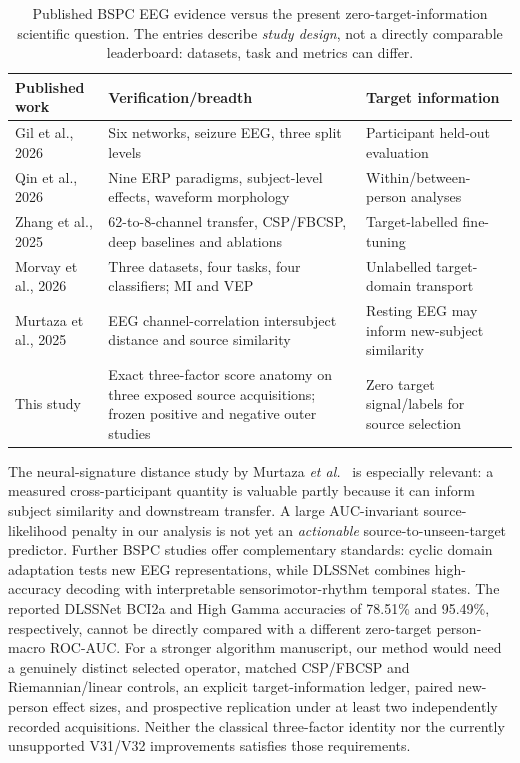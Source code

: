 \begin{table}[tb]
\centering\small
\caption{Published BSPC EEG evidence versus the present
zero-target-information scientific question.
The entries describe \emph{study design}, not
a directly comparable leaderboard:
datasets, task and metrics can differ.}
\label{tab:bspc-paper-budget}
\setlength{\tabcolsep}{3.2pt}
\begin{tabular}{p{.24\linewidth}p{.34\linewidth}p{.30\linewidth}}
\toprule
Published work & Verification/breadth & Target information\\
\midrule
Gil et al., 2026 \cite{gil2026subjectvalidation}
& Six networks, seizure EEG, three split levels
& Participant held-out evaluation\\
Qin et al., 2026 \cite{qin2026spatialnorm}
& Nine ERP paradigms, subject-level effects,
waveform morphology
& Within/between-person analyses\\
Zhang et al., 2025 \cite{zhang2025crossdataset_gcn}
& 62-to-8-channel transfer, CSP/FBCSP,
deep baselines and ablations
& Target-labelled fine-tuning\\
Morvay et al., 2026 \cite{morvay2026wbt}
& Three datasets, four tasks, four
classifiers; MI and VEP
& Unlabelled target-domain transport\\
Murtaza et al., 2025 \cite{murtaza2025signature}
& EEG channel-correlation intersubject
distance and source similarity
& Resting EEG may inform new-subject similarity\\
This study
& Exact three-factor score anatomy on
three exposed source acquisitions;
frozen positive and negative outer studies
& Zero target signal/labels for source selection\\
\bottomrule
\end{tabular}
\end{table}

The neural-signature distance study by
Murtaza \emph{et al.}\ \cite{murtaza2025signature}
is especially relevant: a measured
cross-participant quantity is valuable partly
because it can inform subject similarity
and downstream transfer. A large
AUC-invariant source-likelihood penalty
in our analysis is not yet an \emph{actionable}
source-to-unseen-target predictor.
Further BSPC studies offer complementary
standards: cyclic domain adaptation
\cite{he2026cyclic} tests new EEG
representations, while DLSSNet
\cite{wang2026dlssnet} combines
high-accuracy decoding with interpretable
sensorimotor-rhythm temporal states.
The reported DLSSNet BCI2a and
High Gamma accuracies of 78.51\%
and 95.49\%, respectively, cannot
be directly compared with a different
zero-target person-macro ROC-AUC.
For a stronger algorithm manuscript,
our method would need a genuinely distinct
selected operator, matched CSP/FBCSP and
Riemannian/linear controls, an explicit
target-information ledger, paired new-person
effect sizes, and prospective replication
under at least two independently recorded
acquisitions. Neither the classical
three-factor identity nor the
currently unsupported V31/V32 improvements
satisfies those requirements.

